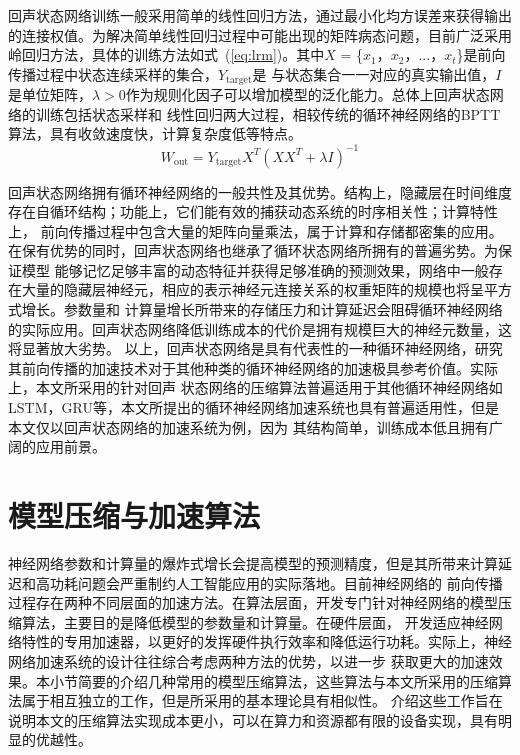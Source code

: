 回声状态网络训练一般采用简单的线性回归方法，通过最小化均方误差来获得输出的连接权值。为解决简单线性回归过程中可能出现的矩阵病态问题，目前广泛采用
岭回归方法，具体的训练方法如式~(\ref{eq:lrm})。其中\(X\) = \{\(x_1\)，\(x_2\)，...，\(x_t\)\}是前向传播过程中状态连续采样的集合，\(Y_{\mathrm{target}}\)是
与状态集合一一对应的真实输出值，\(I\)是单位矩阵，\( \lambda > 0\)作为规则化因子可以增加模型的泛化能力。总体上回声状态网络的训练包括状态采样和
线性回归两大过程，相较传统的循环神经网络的BPTT算法，具有收敛速度快，计算复杂度低等特点。
\begin{equation}\label{eq:lrm}
	W_{\mathrm{out}} = Y_{\mathrm{target}} X^{T}(XX^{T} + \lambda I)^{-1}
\end{equation}

回声状态网络拥有循环神经网络的一般共性及其优势。结构上，隐藏层在时间维度存在自循环结构；功能上，它们能有效的捕获动态系统的时序相关性；计算特性上，
前向传播过程中包含大量的矩阵向量乘法，属于计算和存储都密集的应用。在保有优势的同时，回声状态网络也继承了循环状态网络所拥有的普遍劣势。为保证模型
能够记忆足够丰富的动态特征并获得足够准确的预测效果，网络中一般存在大量的隐藏层神经元，相应的表示神经元连接关系的权重矩阵的规模也将呈平方式增长。参数量和
计算量增长所带来的存储压力和计算延迟会阻碍循环神经网络的实际应用。回声状态网络降低训练成本的代价是拥有规模巨大的神经元数量，这将显著放大劣势。
以上，回声状态网络是具有代表性的一种循环神经网络，研究其前向传播的加速技术对于其他种类的循环神经网络的加速极具参考价值。实际上，本文所采用的针对回声
状态网络的压缩算法普遍适用于其他循环神经网络如LSTM，GRU等，本文所提出的循环神经网络加速系统也具有普遍适用性，但是本文仅以回声状态网络的加速系统为例，因为
其结构简单，训练成本低且拥有广阔的应用前景。
\section{模型压缩与加速算法}
神经网络参数和计算量的爆炸式增长会提高模型的预测精度，但是其所带来计算延迟和高功耗问题会严重制约人工智能应用的实际落地。目前神经网络的
前向传播过程存在两种不同层面的加速方法。在算法层面，开发专门针对神经网络的模型压缩算法，主要目的是降低模型的参数量和计算量。在硬件层面，
开发适应神经网络特性的专用加速器，以更好的发挥硬件执行效率和降低运行功耗。实际上，神经网络加速系统的设计往往综合考虑两种方法的优势，以进一步
获取更大的加速效果。本小节简要的介绍几种常用的模型压缩算法，这些算法与本文所采用的压缩算法属于相互独立的工作，但是所采用的基本理论具有相似性。
介绍这些工作旨在说明本文的压缩算法实现成本更小，可以在算力和资源都有限的设备实现，具有明显的优越性。

